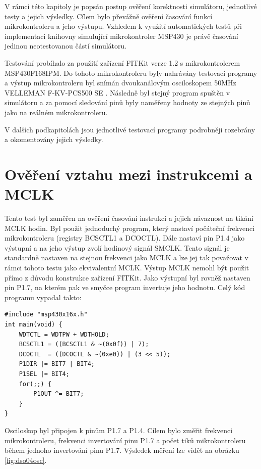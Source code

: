 V rámci této kapitoly je popsán postup ověření korektnosti simulátoru, jednotlivé testy a jejich výsledky. Cílem bylo převážně ověření časování funkcí mikrokontroleru a jeho výstupu. Vzhledem k využití automatických testů při implementaci knihovny simulující mikrokontroler MSP430 je právě časování jedinou neotestovanou částí simulátoru.

Testování probíhalo za použití zařízení FITKit verze 1.2 s mikrokontrolerem MSP430F168IPM. Do tohoto mikrokontroleru byly nahrávány testovací programy a výstup mikrokontroleru byl snímán dvoukanálovým osciloskopem 50MHz VELLEMAN F-KV-PCS500 SE \cite{velleman}. Následně byl stejný program spuštěn v simulátoru a za pomocí sledování pinů byly naměřeny hodnoty ze stejných pinů jako na reálném mikrokontroleru.

V dalších podkapitolách jsou jednotlivé testovací programy podrobněji rozebrány a okomentovány jejich výsledky.

\section{Ověření vztahu mezi instrukcemi a MCLK}
\label{test1}

Tento test byl zaměřen na ověření časování instrukcí a jejich návaznost na tikání MCLK hodin. Byl použit jednoduchý program, který nastaví počáteční frekvenci mikrokontroleru (registry BCSCTL1 a DCOCTL). Dále nastaví pin P1.4 jako výstupní a na jeho výstup zvolí hodinový signál SMCLK. Tento signál je standardně nastaven na stejnou frekvenci jako MCLK a lze jej tak považovat v rámci tohoto testu jako ekvivalentní MCLK. Výstup MCLK nemohl být použit přímo z důvodu konstrukce zařízení FITKit. Jako výstupní byl rovněž nastaven pin P1.7, na kterém pak ve smyčce program invertuje jeho hodnotu. Celý kód programu vypadal takto:

\lstset{language=XML, numbers=left, frame=single, breaklines=true, tabsize=2, xleftmargin=20pt}
\begin{lstlisting}
#include "msp430x16x.h"
int main(void) {
	WDTCTL = WDTPW + WDTHOLD;
	BCSCTL1 = ((BCSCTL1 & ~(0x0f)) | 7);
	DCOCTL  = ((DCOCTL & ~(0xe0)) | (3 << 5));
	P1DIR |= BIT7 | BIT4;
	P1SEL |= BIT4;
	for(;;) {
		P1OUT ^= BIT7;
	}
}
\end{lstlisting}

Osciloskop byl připojen k pinům P1.7 a P1.4. Cílem bylo změřit frekvenci mikrokontroleru, frekvenci invertování pinu P1.7 a počet tiků mikrokontroleru během jednoho invertování pinu P1.7. Výsledek měření lze vidět na obrázku \ref{fig:dso04osc}.

